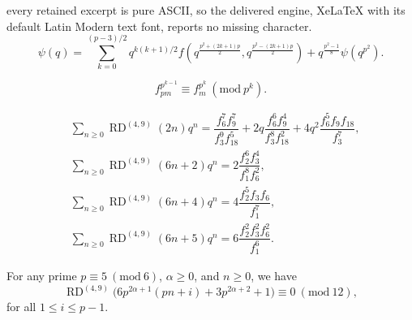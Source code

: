 \documentclass[10pt,a4paper]{amsart}
\DeclareMathOperator {\myRD}{RD}
\begin{document}
every retained excerpt is pure ASCII, so the delivered engine, XeLaTeX with its default Latin Modern text font, reports no missing character.
\begin{equation}
\psi(q)= \sum_{k=0}^{(p-3)/2} q^{k(k+1)/2} f(q^{\frac{p^{2}+(2k+1)p}{2}}, q^{\frac{p^{2}-(2k+1)p}{2}})+ q^{\frac{p^{2}-1}{8}}\psi(q^{p^{2}}).
 \label{psidissection}
\end{equation}

\begin{equation}
 f_{pm}^{p^{k-1}} \equiv f_{m}^{p^{k}}  \ (\mathrm{mod} \ p^{k}). \label{binomiallemma} 
\end{equation}

\begin{align}
&\sum_{n\geq 0} \myRD^{(4, 9)}(2n)q^{n}=\dfrac{f_{6}^{7}f_{9}^{7}}{f_{3}^{9}f_{18}^{5}}+2q\dfrac{f_{6}^{6}f_{9}^{4}}{f_{3}^{8}f_{18}^{2}}+4q^{2}\dfrac{f_{6}^{5}f_{9}f_{18}}{f_{3}^{7}}, \label{dd1}\\
&\sum_{n\geq 0} \myRD^{(4, 9)}(6n+2)q^{n}=2\dfrac{f_{2}^{6}f_{3}^{4}}{f_{1}^{8}f_{6}^{2}}, \label{d1}\\
&\sum_{n\geq 0} \myRD^{(4, 9)}(6n+4)q^{n}=4\dfrac{f_{2}^{5}f_{3}f_{6}}{f_{1}^{7}}, \label{d2}\\
&\sum_{n\geq 0} \myRD^{(4, 9)}(6n+5)q^{n}= 6\dfrac{f_{2}^{2}f_{3}^{2}f_{6}^{2}}{f_{1}^{6}}. \label{d3}
\end{align}

 \begin{theorem} \label{thm} For any prime $p\equiv 5 \ (\mathrm{mod} \ 6)$, $\alpha \geq 0$, and $n\geq 0$, we have
\[
\myRD^{(4, 9)} \big(6p^{2\alpha+1}(pn+i)+3p^{2\alpha+2}+1 \big)\equiv 0 \ (\mathrm{mod} \ 12),
\]
for all $1\leq i \leq p-1$.
\end{theorem}
\end{document}
